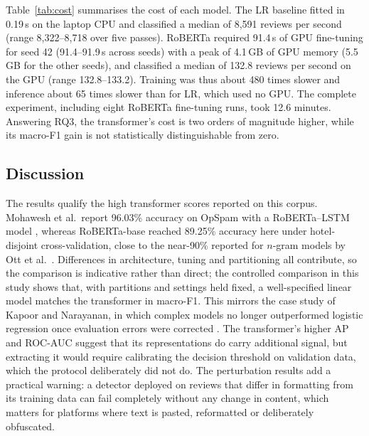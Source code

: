 Table~\ref{tab:cost} summarises the cost of each model. The LR baseline fitted in 0.19\,s on the laptop CPU and classified a median of 8,591 reviews per second (range 8,322--8,718 over five passes). RoBERTa required 91.4\,s of GPU fine-tuning for seed 42 (91.4--91.9\,s across seeds) with a peak of 4.1\,GB of GPU memory (5.5\,GB for the other seeds), and classified a median of 132.8 reviews per second on the GPU (range 132.8--133.2). Training was thus about 480 times slower and inference about 65 times slower than for LR, which used no GPU. The complete experiment, including eight RoBERTa fine-tuning runs, took 12.6 minutes. Answering RQ3, the transformer's cost is two orders of magnitude higher, while its macro-F1 gain is not statistically distinguishable from zero.

\subsection{Discussion}
The results qualify the high transformer scores reported on this corpus. Mohawesh et al.\ report 96.03\% accuracy on OpSpam with a RoBERTa--LSTM model \cite{ref15}, whereas RoBERTa-base reached 89.25\% accuracy here under hotel-disjoint cross-validation, close to the near-90\% reported for $n$-gram models by Ott et al.\ \cite{ref22}. Differences in architecture, tuning and partitioning all contribute, so the comparison is indicative rather than direct; the controlled comparison in this study shows that, with partitions and settings held fixed, a well-specified linear model matches the transformer in macro-F1. This mirrors the case study of Kapoor and Narayanan, in which complex models no longer outperformed logistic regression once evaluation errors were corrected \cite{kapoor2023}. The transformer's higher AP and ROC-AUC suggest that its representations do carry additional signal, but extracting it would require calibrating the decision threshold on validation data, which the protocol deliberately did not do. The perturbation results add a practical warning: a detector deployed on reviews that differ in formatting from its training data can fail completely without any change in content, which matters for platforms where text is pasted, reformatted or deliberately obfuscated.
